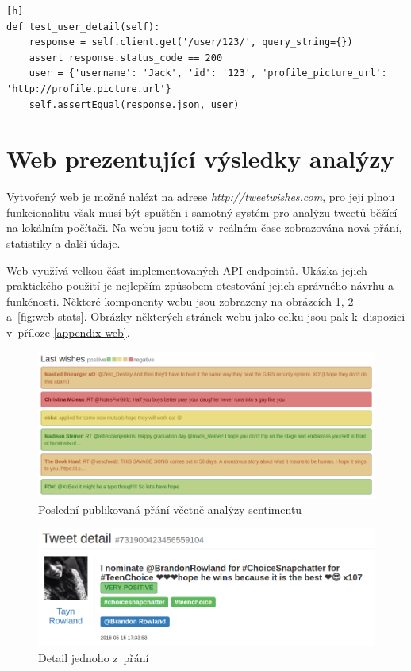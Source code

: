\documentclass[thesis=B,czech]{FITthesis}[2012/06/26]
\begin{document}
\begin{lstlisting}[caption={Test endpointu /user/<user\_id>},label=user-test][h]
def test_user_detail(self):
	response = self.client.get('/user/123/', query_string={})
	assert response.status_code == 200
	user = {'username': 'Jack', 'id': '123', 'profile_picture_url': 'http://profile.picture.url'}
	self.assertEqual(response.json, user)
\end{lstlisting}


\section{Web prezentující výsledky analýzy}
Vytvořený web je možné nalézt na adrese \textit{http://tweetwishes.com}, pro její plnou funkcionalitu však musí být spuštěn i samotný systém pro analýzu tweetů běžící na lokálním počítači. Na webu jsou totiž v~reálném čase zobrazována nová přání, statistiky a další údaje. 

Web využívá velkou část implementovaných API endpointů. Ukázka jejich praktického použití je nejlepším způsobem otestování jejich správného návrhu a funkčnosti. Některé komponenty webu jsou zobrazeny na obrázcích \ref{fig:web-last-tweets}, \ref{fig:web-detail} a~\ref{fig:web-stats}. Obrázky některých stránek webu jako celku jsou pak k~dispozici v~příloze \ref{appendix-web}. 

	\begin{figure}[ht]
    	\centering
    	\includegraphics[width=1\textwidth]{images/web-wishes.png}
    	\caption{Poslední publikovaná přání včetně analýzy sentimentu}
    	\label{fig:web-last-tweets}
	\end{figure}

	\begin{figure}[ht]
    	\centering
    	\includegraphics[width=1\textwidth]{images/web-detail.png}
    	\caption{Detail jednoho z~přání}
    	\label{fig:web-detail}
	\end{figure}
	
\end{document}
